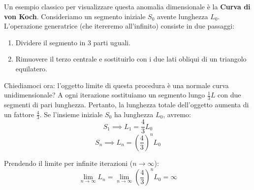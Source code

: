 \documentclass[openany]{book}
\theoremstyle{definition}
\theoremstyle{remark}
\begin{document}
Un esempio classico per visualizzare questa anomalia dimensionale è la \textbf{Curva di von Koch}.
Consideriamo un segmento iniziale $S_0$ avente lunghezza $L_0$. L'operazione generatrice (che itereremo all'infinito) consiste in due passaggi:
\begin{enumerate}
    \item Dividere il segmento in 3 parti uguali.
    \item Rimuovere il terzo centrale e sostituirlo con i due lati obliqui di un triangolo equilatero.
\end{enumerate}

\begin{center}
\end{center}

Chiediamoci ora: l'oggetto limite di questa procedura è una normale curva unidimensionale? 
A ogni iterazione sostituiamo un segmento lungo $\frac{1}{3}L$ con due segmenti di pari lunghezza. Pertanto, la lunghezza totale dell'oggetto aumenta di un fattore $\frac{4}{3}$. Se l'insieme iniziale $S_0$ ha lunghezza $L_0$, avremo:
\begin{equation}
    S_1 \implies L_1 = \frac{4}{3} L_0
\end{equation}
\begin{equation}
    S_n \implies L_n = \left(\frac{4}{3}\right)^n L_0
\end{equation}

Prendendo il limite per infinite iterazioni ($n \to \infty$):
\begin{equation}
    \lim_{n \to \infty} L_n = \lim_{n \to \infty} \left(\frac{4}{3}\right)^n L_0 = \infty
\end{equation}
\end{document}
